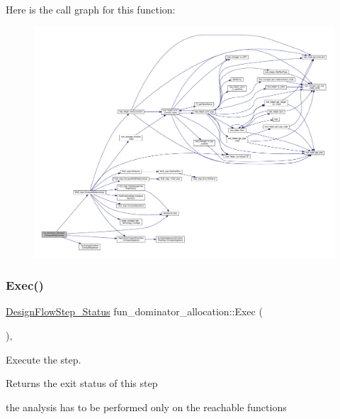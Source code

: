 Here is the call graph for this function\+:
\nopagebreak
\begin{figure}[H]
\begin{center}
\leavevmode
\includegraphics[width=350pt]{d3/d75/classfun__dominator__allocation_aced73fc0e76b139d3fca739237f0542b_cgraph}
\end{center}
\end{figure}
\mbox{\label{classfun__dominator__allocation_aab3d1e1e5b22f40816fa73325bcab578}} 
\subsubsection{\texorpdfstring{Exec()}{Exec()}}
{\footnotesize\ttfamily \hyperlink{design__flow__step_8hpp_afb1f0d73069c26076b8d31dbc8ebecdf}{Design\+Flow\+Step\+\_\+\+Status} fun\+\_\+dominator\+\_\+allocation\+::\+Exec (\begin{DoxyParamCaption}{ }\end{DoxyParamCaption})\hspace{0.3cm}{\ttfamily [override]}, {\ttfamily [virtual]}}



Execute the step. 

\begin{DoxyReturn}{Returns}
the exit status of this step 
\end{DoxyReturn}
the analysis has to be performed only on the reachable functions

